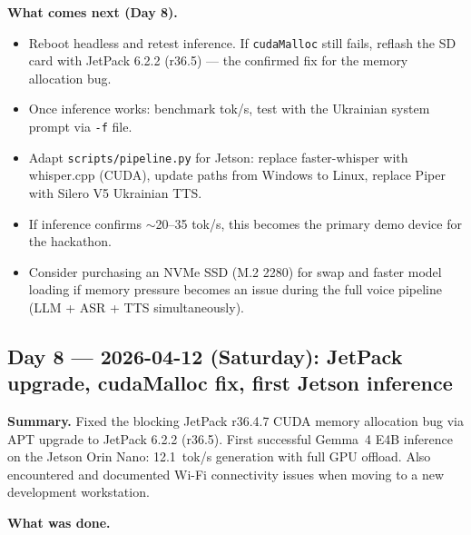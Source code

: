 \documentclass{article}
\theoremstyle{plain}
\theoremstyle{definition}
\theoremstyle{remark}
\begin{document}
\textbf{What comes next (Day 8).}
\begin{itemize}
\item Reboot headless and retest inference. If \texttt{cudaMalloc} still fails, reflash the SD card with JetPack 6.2.2 (r36.5) --- the confirmed fix for the memory allocation bug.
\item Once inference works: benchmark tok/s, test with the Ukrainian system prompt via \texttt{-f} file.
\item Adapt \texttt{scripts/pipeline.py} for Jetson: replace faster-whisper with whisper.cpp (CUDA), update paths from Windows to Linux, replace Piper with Silero V5 Ukrainian TTS.
\item If inference confirms $\sim$20--35 tok/s, this becomes the primary demo device for the hackathon.
\item Consider purchasing an NVMe SSD (M.2 2280) for swap and faster model loading if memory pressure becomes an issue during the full voice pipeline (LLM + ASR + TTS simultaneously).
\end{itemize}

\subsection*{Day 8 --- 2026-04-12 (Saturday): JetPack upgrade, cudaMalloc fix, first Jetson inference}

\textbf{Summary.} Fixed the blocking JetPack r36.4.7 CUDA memory allocation bug via APT upgrade to JetPack 6.2.2 (r36.5). First successful Gemma~4 E4B inference on the Jetson Orin Nano: 12.1~tok/s generation with full GPU offload. Also encountered and documented Wi-Fi connectivity issues when moving to a new development workstation.

\textbf{What was done.}
\end{document}
